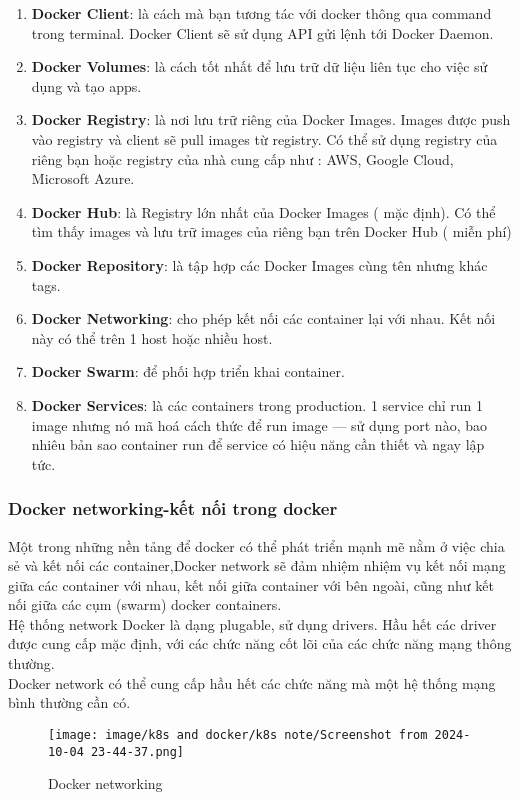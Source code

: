\documentclass[a4paper,12pt]{article}
\begin{document}
\begin{enumerate}
    \item \textbf{Docker Client}: là cách mà bạn tương tác với docker thông qua command trong terminal. Docker Client sẽ sử dụng API gửi lệnh tới Docker Daemon.
    \item \textbf{Docker Volumes}: là cách tốt nhất để lưu trữ dữ liệu liên tục cho việc sử dụng và tạo apps.
    \item \textbf{Docker Registry}: là nơi lưu trữ riêng của Docker Images. Images được push vào registry và client sẽ pull images từ registry. Có thể sử dụng registry của riêng bạn hoặc registry của nhà cung cấp như : AWS, Google Cloud, Microsoft Azure.
    \item \textbf{Docker Hub}: là Registry lớn nhất của Docker Images ( mặc định). Có thể tìm thấy images và lưu trữ images của riêng bạn trên Docker Hub ( miễn phí)
    \item \textbf{Docker Repository}: là tập hợp các Docker Images cùng tên nhưng khác tags.
    \item \textbf{Docker Networking}: cho phép kết nối các container lại với nhau. Kết nối này có thể trên 1 host hoặc nhiều host.
    \item \textbf{Docker Swarm}: để phối hợp triển khai container.
    \item \textbf{Docker Services}: là các containers trong production. 1 service chỉ run 1 image nhưng nó mã hoá cách thức để run image — sử dụng port nào, bao nhiêu bản sao container run để service có hiệu năng cần thiết và ngay lập tức.
\end{enumerate}
\subsubsection{ Docker networking-kết nối trong docker}
Một trong những nền tảng để docker có thể phát triển mạnh mẽ nằm ở việc chia sẻ và kết nối các container,Docker network sẽ đảm nhiệm nhiệm vụ kết nối mạng giữa các container với nhau, kết nối giữa container với bên ngoài, cũng như kết nối giữa các cụm (swarm) docker containers.\\
Hệ thống network Docker là dạng plugable, sử dụng drivers. Hầu hết các driver được cung cấp mặc định, với các chức năng cốt lõi của các chức năng mạng thông thường.\\
Docker network có thể cung cấp hầu hết các chức năng mà một hệ thống mạng bình thường cần có.\\

\begin{figure}[htbp]
    \centering
    \texttt{[image: image/k8s and docker/k8s note/Screenshot from 2024-10-04 23-44-37.png]}
    \caption{Docker networking}
    \label{}
\end{figure}
\end{document}
